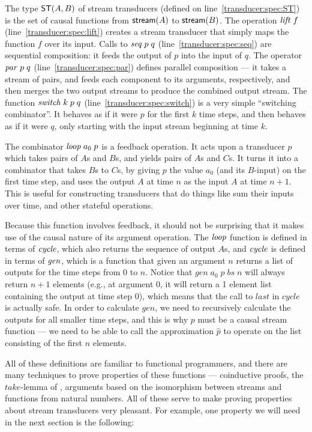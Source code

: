 \documentclass[natbib]{sigplanconf}
\begin{document}
The type $\mbox{\textsf{{ST}}}({A}, {B})$ of stream transducers (defined on
line~\ref{transducer:spec:ST}) is the set of causal functions from
$\mbox{\textsf{{stream}}}({A})$ to $\mbox{\textsf{{stream}}}({B})$. The operation $\mathit{lift}\;f$
(line~\ref{transducer:spec:lift}) creates a stream transducer that
simply maps the function $f$ over its input.  Calls to $\mathit{seq}\;p\;q$
(line~\ref{transducer:spec:seq}) are sequential composition: it feeds
the output of $p$ into the input of $q$. The operator $\mathit{par}\;p\;q$
(line~\ref{transducer:spec:par}) defines parallel composition --- it
takes a stream of pairs, and feeds each component to its arguments,
respectively, and then merges the two output streams to produce the
combined output stream. The function $\mathit{switch}\;k\;p\;q$
(line~\ref{transducer:spec:switch}) is a very simple ``switching
combinator''.  It behaves as if it were $p$ for the first $k$ time
steps, and then behaves as if it were $q$, only starting with the
input stream beginning at time $k$.

The combinator $\mathit{loop}\;a_0\;p$ is a feedback operation. It acts
upon a transducer $p$ which takes pairs of $A$s and $B$s, and yields
pairs of $A$s and $C$s. It turns it into a combinator that takes $B$s
to $C$s, by giving $p$ the value $a_0$ (and its $B$-input) on the
first time step, and uses the output $A$ at time $n$ as the input $A$
at time $n+1$. This is useful for constructing transducers that do
things like sum their inputs over time, and other stateful operations. 

Because this function involves feedback, it should not be surprising
that it makes use of the causal nature of its argument operation. The
$\mathit{loop}$ function is defined in terms of $\mathit{cycle}$, which also 
returns the sequence of output $A$s, and $\mathit{cycle}$ is defined in 
terms of $\mathit{gen}$, which is a function that given an argument $n$ returns a list of
outputs for the time steps from $0$ to $n$. Notice that
$gen\;a_0\;p\;bs\;n$ will always return $n+1$ elements (e.g., at
argument 0, it will return a 1 element list containing the output at
time step 0), which means that the call to $last$ in $cycle$ is
actually safe. In order to calculate $gen$, we need to recursively
calculate the outputs for all smaller time steps, and this is why $p$
must be a causal stream function --- we need to be able to call the 
approximation $\hat{p}$ to operate on the list consisting of
the first $n$ elements. 

All of these definitions are familiar to functional programmers, and
there are many techniques to prove properties of these functions ---
coinductive proofs, the $take$-lemma of \citet{bird-wadler}, arguments based on
the isomorphism between streams and functions from natural
numbers. All of these serve to make proving properties about stream
transducers very pleasant. For example, one property we will need in
the next section is the following:
\end{document}
